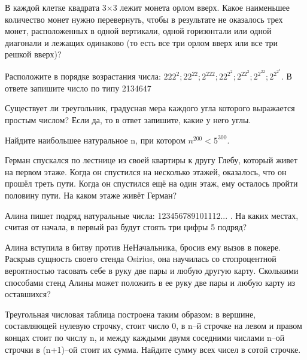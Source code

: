 \newpage

\hspace{3mm}

В каждой клетке квадрата 3×3 лежит монета орлом вверх. Какое наименьшее количество монет нужно перевернуть, чтобы в результате не оказалось трех монет, расположенных в одной вертикали, одной горизонтали или одной диагонали и лежащих одинаково (то есть все три орлом вверх или все три решкой вверх)?

Расположите в порядке возрастания числа: $222^2; 22^{22}; 2^{222}; 22^{2^{2}}; 2^{22^2}; 2^{2^{22}}; 2^{2^{2^2}}$. В ответе запишите число по типу 2134647


Существует ли треугольник, градусная мера каждого угла которого выражается простым числом? Если да, то в ответ запишите, какие у него углы.

Найдите наибольшее натуральное n, при котором  $n^{200} < 5^{300}$.

Герман спускался по лестнице из своей квартиры к другу Глебу, который живет на первом этаже. Когда он спустился на несколько этажей, оказалось, что он прошёл треть пути. Когда он спустился ещё на один этаж, ему осталось пройти половину пути. На каком этаже живёт Герман?

Алина пишет подряд натуральные числа: 123456789101112... .
На каких местах, считая от начала, в первый раз будут стоять три цифры 5 подряд?

Алина вступила в битву против НеНачальника, бросив ему вызов в покере. Раскрыв сущность своего стенда Osirius, она научилась со стопроцентной вероятностью тасовать себе в руку две пары и любую другую карту. Сколькими способами стенд Алины может положить в ее руку две пары и любую карту из оставшихся?

Треугольная числовая таблица построена таким образом: в вершине, составляющей нулевую строчку, стоит число 0, в n–й строчке на левом и правом концах стоит по числу n, и между каждыми двумя соседними числами n–ой строчки в (n+1)–ой стоит их сумма. Найдите сумму всех чисел в сотой строчке.
